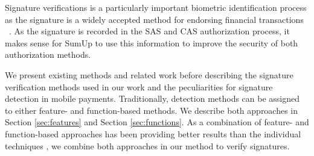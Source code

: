 \documentclass[a4paper, oneside]{csthesis}
\begin{document}
Signature verifications is a particularly important biometric identification process as the signature is a widely accepted method for endorsing financial transactions ~\cite{1227706}.
As the signature is recorded in the SAS and CAS authorization process, it makes sense for SumUp to use this information to improve the security of both authorization methods.

We present existing methods and related work before describing the signature verification methods used in our work and the peculiarities for signature detection in mobile payments.
Traditionally, detection methods can be assigned to either feature- and function-based methods. We describe both approaches in Section \ref{sec:features} and Section \ref{sec:functions}. As a combination of feature- and function-based approaches has been providing better results than the individual techniques \cite{fierrez2005line}, we combine both approaches in our method to verify signatures.



\end{document}
